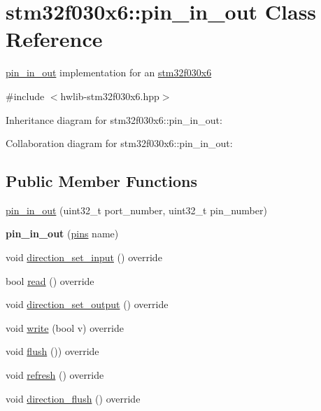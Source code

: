 \hypertarget{classstm32f030x6_1_1pin__in__out}{}\section{stm32f030x6\+:\+:pin\+\_\+in\+\_\+out Class Reference}
\label{classstm32f030x6_1_1pin__in__out}


\hyperlink{classstm32f030x6_1_1pin__in__out}{pin\+\_\+in\+\_\+out} implementation for an \hyperlink{namespacestm32f030x6}{stm32f030x6}  




{\ttfamily \#include $<$hwlib-\/stm32f030x6.\+hpp$>$}



Inheritance diagram for stm32f030x6\+:\+:pin\+\_\+in\+\_\+out\+:


Collaboration diagram for stm32f030x6\+:\+:pin\+\_\+in\+\_\+out\+:
\subsection*{Public Member Functions}
\begin{DoxyCompactItemize}
\item 
\hyperlink{classstm32f030x6_1_1pin__in__out_a5d50cdae0ea2ce5bce18c93f4a16cebe}{pin\+\_\+in\+\_\+out} (uint32\+\_\+t port\+\_\+number, uint32\+\_\+t pin\+\_\+number)
\item 
\mbox{\label{classstm32f030x6_1_1pin__in__out_ae790d35983708563627957774a72c7e7}} 
{\bfseries pin\+\_\+in\+\_\+out} (\hyperlink{namespacestm32f030x6_aec819db41bff19f45418c0d22e5ccecf}{pins} name)
\item 
void \hyperlink{classstm32f030x6_1_1pin__in__out_acdd7df5a6a647c2e4f63587880a855ca}{direction\+\_\+set\+\_\+input} () override
\item 
bool \hyperlink{classstm32f030x6_1_1pin__in__out_a94c8a2495046a0240cf7bc42e870d289}{read} () override
\item 
void \hyperlink{classstm32f030x6_1_1pin__in__out_a67a4cc5a76ccf6070d6aad1b5c7bfc01}{direction\+\_\+set\+\_\+output} () override
\item 
void \hyperlink{classstm32f030x6_1_1pin__in__out_a395ac1700d5df47ef841ae4405837e1d}{write} (bool v) override
\item 
void \hyperlink{classstm32f030x6_1_1pin__in__out_a89e04e9a27e2eab76739b4c9195abd34}{flush} ()) override
\item 
void \hyperlink{classstm32f030x6_1_1pin__in__out_a5afd4fa1e88219976b7d4d5690edc0b1}{refresh} () override
\item 
void \hyperlink{classstm32f030x6_1_1pin__in__out_abb67031a092b24143ae7db116b876774}{direction\+\_\+flush} () override
\end{DoxyCompactItemize}


